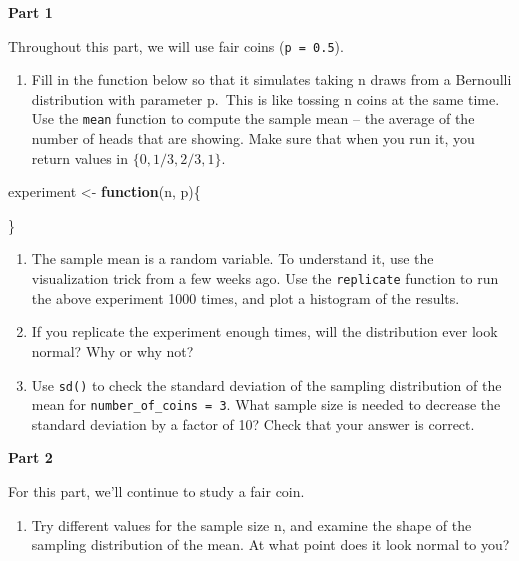 \documentclass[
]{book}
\newenvironment{Shaded}{\begin{snugshade}}{\end{snugshade}}
\newcommand{\ControlFlowTok}[1]{\textcolor[rgb]{0.13,0.29,0.53}{\textbf{#1}}}
\newcommand{\NormalTok}[1]{#1}
\newcommand{\OtherTok}[1]{\textcolor[rgb]{0.56,0.35,0.01}{#1}}
\providecommand{\tightlist}{%
  \setlength{\itemsep}{0pt}\setlength{\parskip}{0pt}}
\theoremstyle{definition}
\theoremstyle{definition}
\theoremstyle{definition}
\theoremstyle{definition}
\theoremstyle{remark}
\begin{document}
\textbf{Part 1}

Throughout this part, we will use fair coins (\texttt{p\ =\ 0.5}).

\begin{enumerate}
\def\labelenumi{\arabic{enumi}.}
\tightlist
\item
  Fill in the function below so that it simulates taking n draws from a Bernoulli distribution with parameter p.~This is like tossing n coins at the same time. Use the \texttt{mean} function to compute the sample mean -- the average of the number of heads that are showing. Make sure that when you run it, you return values in \(\{0,1/3,2/3,1\}\).
\end{enumerate}

\begin{Shaded}
\begin{Highlighting}[]
\NormalTok{experiment }\OtherTok{\textless{}{-}} \ControlFlowTok{function}\NormalTok{(n, p)\{}

\NormalTok{  \}}
\end{Highlighting}
\end{Shaded}

\begin{enumerate}
\def\labelenumi{\arabic{enumi}.}
\setcounter{enumi}{1}
\item
  The sample mean is a random variable. To understand it, use the visualization trick from a few weeks ago. Use the \texttt{replicate} function to run the above experiment 1000 times, and plot a histogram of the results.
\item
  If you replicate the experiment enough times, will the distribution ever look normal? Why or why not?
\item
  Use \texttt{sd()} to check the standard deviation of the sampling distribution of the mean for \texttt{number\_of\_coins\ =\ 3}. What sample size is needed to decrease the standard deviation by a factor of 10? Check that your answer is correct.
\end{enumerate}

\textbf{Part 2}

For this part, we'll continue to study a fair coin.

\begin{enumerate}
\def\labelenumi{\arabic{enumi}.}
\setcounter{enumi}{4}
\tightlist
\item
  Try different values for the sample size n, and examine the shape of the sampling distribution of the mean. At what point does it look normal to you?
\end{enumerate}
\end{document}
